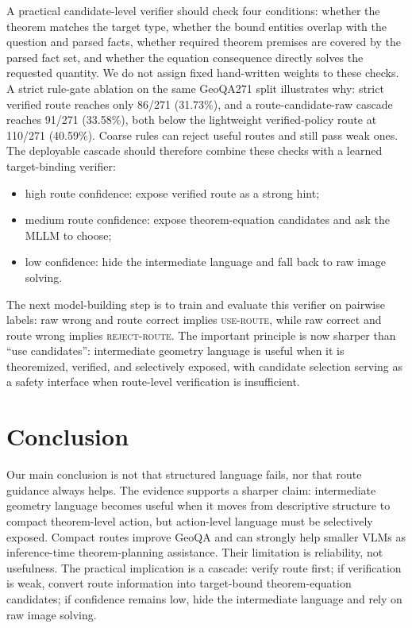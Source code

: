 \documentclass[11pt]{article}
\begin{document}
A practical candidate-level verifier should check four conditions: whether the theorem matches the target type, whether the bound entities overlap with the question and parsed facts, whether required theorem premises are covered by the parsed fact set, and whether the equation consequence directly solves the requested quantity. We do not assign fixed hand-written weights to these checks. A strict rule-gate ablation on the same GeoQA271 split illustrates why: strict verified route reaches only 86/271 (31.73\%), and a route-candidate-raw cascade reaches 91/271 (33.58\%), both below the lightweight verified-policy route at 110/271 (40.59\%). Coarse rules can reject useful routes and still pass weak ones. The deployable cascade should therefore combine these checks with a learned target-binding verifier:

\begin{itemize}[leftmargin=*]
\item high route confidence: expose verified route as a strong hint;
\item medium route confidence: expose theorem-equation candidates and ask the MLLM to choose;
\item low confidence: hide the intermediate language and fall back to raw image solving.
\end{itemize}

The next model-building step is to train and evaluate this verifier on pairwise labels: raw wrong and route correct implies \textsc{use-route}, while raw correct and route wrong implies \textsc{reject-route}. The important principle is now sharper than ``use candidates'': intermediate geometry language is useful when it is theoremized, verified, and selectively exposed, with candidate selection serving as a safety interface when route-level verification is insufficient.

\section{Conclusion}
Our main conclusion is not that structured language fails, nor that route guidance always helps. The evidence supports a sharper claim: intermediate geometry language becomes useful when it moves from descriptive structure to compact theorem-level action, but action-level language must be selectively exposed. Compact routes improve GeoQA and can strongly help smaller VLMs as inference-time theorem-planning assistance. Their limitation is reliability, not usefulness. The practical implication is a cascade: verify route first; if verification is weak, convert route information into target-bound theorem-equation candidates; if confidence remains low, hide the intermediate language and rely on raw image solving.
\end{document}

